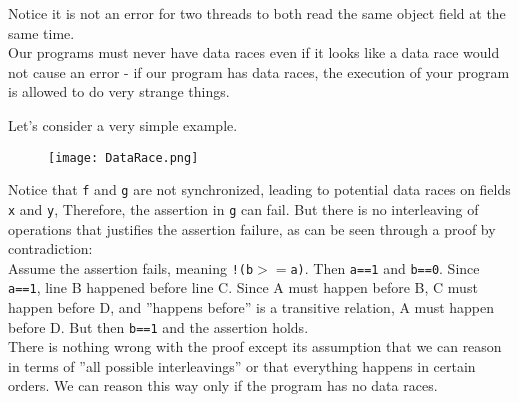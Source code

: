 \documentclass[main]{subfiles}
\begin{document}
\noindent Notice it is not an error for two threads to both read the same object field at the same time.\\[3mm]
Our programs must never have data races even if it looks like a data race would not cause an error - if our program has data races, the execution of your program is allowed to do very strange things.
\begin{example}
    Let's consider a very simple example.
    \begin{figure}[H]
        \centering
        \texttt{[image: DataRace.png]}
    \end{figure}
    Notice that \texttt{f} and \texttt{g} are not synchronized, leading to potential data races on fields \texttt{x} and \texttt{y}, Therefore, the assertion in \texttt{g} can fail. But there is no interleaving of operations that justifies the assertion failure, as can be seen through a proof by contradiction: \\[3mm]
    \quad Assume the assertion fails, meaning \texttt{!(b$>=$a)}. Then \texttt{a==1} and \texttt{b==0}. Since \texttt{a==1}, line B happened before line C. Since A must happen before B, C must happen before D, and ''happens before'' is a transitive relation, A must happen before D. But then \texttt{b==1} and the assertion holds.\\[3mm]
    There is nothing wrong with the proof except its assumption that we can reason in terms of ''all possible interleavings'' or that everything happens in certain orders. We can reason this way only if the program has no data races.
\end{example}
\end{document}
